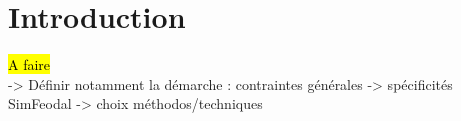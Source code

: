 \clearpage
\section*{Introduction}
\hl{A faire}\\
-> Définir notamment la démarche : contraintes générales -> spécificités SimFeodal -> choix méthodos/techniques